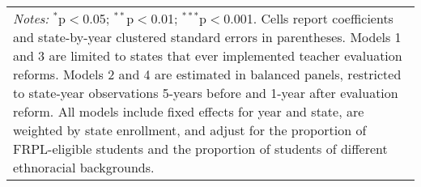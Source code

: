\begin{table}[!htbp]
\begin{tabular}{lcccccc}
\multicolumn{7}{l}{
	\begin{minipage}{13cm} \footnotesize \emph{Notes:} $^{*}$p$<$0.05; $^{**}$p$<$0.01; $^{***}$p$<$0.001. Cells report coefficients and state-by-year clustered standard errors in parentheses. Models 1 and 3 are limited to states that ever implemented teacher evaluation reforms. Models 2 and 4 are estimated in balanced panels, restricted to state-year observations 5-years before and 1-year after evaluation reform. All models include fixed effects for year and state, are weighted by state enrollment, and adjust for the proportion of FRPL-eligible students and the proportion of students of different ethnoracial backgrounds.
\end{minipage}
} \\
\end{tabular}
\end{table}


